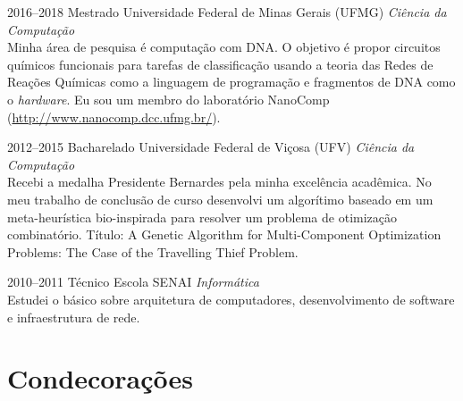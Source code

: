 \documentclass[a4paper]{cv-friggeri-x}
\begin{document}
\begin{entrylist}

\entry
    {2016--2018}
    {Mestrado}
    {Universidade Federal de Minas Gerais (UFMG)}
    {\emph{Ciência da Computação}\\
    Minha área de pesquisa é computação com DNA. O objetivo é propor circuitos químicos funcionais para tarefas de classificação usando a teoria das Redes de Reações Químicas como a linguagem de programação e fragmentos de DNA como o \textit{hardware}. Eu sou um membro do laboratório NanoComp (\href{http://www.nanocomp.dcc.ufmg.br/}{http://www.nanocomp.dcc.ufmg.br/}).}

\entry
    {2012--2015}
    {Bacharelado}
    {Universidade Federal de Vi\c cosa (UFV)}
    {\emph{Ciência da Computação}\\
    Recebi a medalha Presidente Bernardes pela minha excelência acadêmica. No meu trabalho de conclusão de curso desenvolvi um algorítimo baseado em um meta-heurística bio-inspirada para resolver um problema de otimização combinatório. Título: A Genetic Algorithm for Multi-Component Optimization Problems: The Case of the Travelling Thief Problem.}


\entry
    {2010--2011}
    {Técnico}
    {Escola SENAI}
    {\emph{Informática}\\
    Estudei o básico sobre arquitetura de computadores, desenvolvimento de software e infraestrutura de rede.}



\end{entrylist}


\section{Condecorações}
\end{document}
